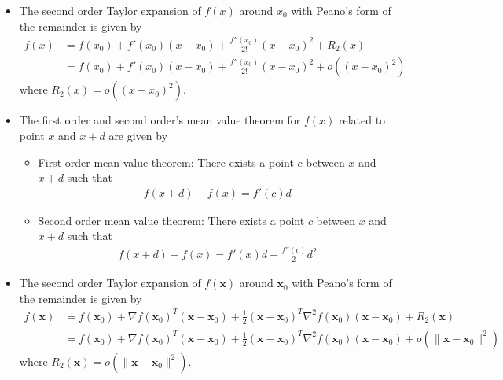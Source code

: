 \begin{itemize}
    \item [(a)] The second order Taylor expansion of $f(x)$ around $x_0$ with Peano's form of the remainder is given by
    \begin{align*}
        f(x) &= f(x_0) + f'(x_0)(x-x_0) + \frac{f''(x_0)}{2!}(x-x_0)^2 + R_2(x) \\
        &= f(x_0) + f'(x_0)(x-x_0) + \frac{f''(x_0)}{2!}(x-x_0)^2 + o((x-x_0)^2)
    \end{align*}
    where $R_2(x) = o((x-x_0)^2)$.

    \item [(b)] The first order and second order's mean value theorem for $f(x)$ related to point $x$ and $x+d$ are given by
    \begin{itemize}
        \item First order mean value theorem: There exists a point $c$ between $x$ and $x+d$ such that
        \begin{align*}
            f(x+d) - f(x) = f'(c)d
        \end{align*}
        \item Second order mean value theorem: There exists a point $c$ between $x$ and $x+d$ such that
        \begin{align*}
            f(x+d) - f(x) = f'(x)d + \frac{f''(c)}{2}d^2
        \end{align*}
    \end{itemize}

    \item [(c)] The second order Taylor expansion of $f(\mathbf{x})$ around $\mathbf{x}_0$ with Peano's form of the remainder is given by
    \begin{align*}
        f(\mathbf{x}) &= f(\mathbf{x}_0) + \nabla f(\mathbf{x}_0)^T(\mathbf{x}-\mathbf{x}_0) + \frac{1}{2}(\mathbf{x}-\mathbf{x}_0)^T \nabla^2 f(\mathbf{x}_0)(\mathbf{x}-\mathbf{x}_0) + R_2(\mathbf{x}) \\
        &= f(\mathbf{x}_0) + \nabla f(\mathbf{x}_0)^T(\mathbf{x}-\mathbf{x}_0) + \frac{1}{2}(\mathbf{x}-\mathbf{x}_0)^T \nabla^2 f(\mathbf{x}_0)(\mathbf{x}-\mathbf{x}_0) + o(\|\mathbf{x}-\mathbf{x}_0\|^2)
    \end{align*}
    where $R_2(\mathbf{x}) = o(\|\mathbf{x}-\mathbf{x}_0\|^2)$.


\end{itemize}
